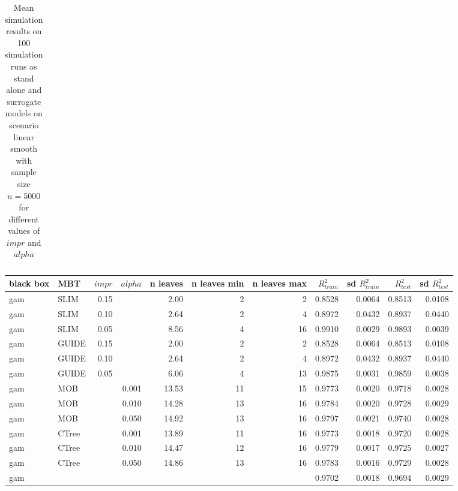 \begin{table}[!htb]
\begin{tabular}[t]{l|l|r|r|r|r|r|r|r|r|r}
\hline
\end{tabular}
\caption{Mean simulation results on 100 simulation runs as stand alone and surrogate models on scenario linear smooth with sample size $n = 5000$ for different values of $impr$ and $alpha$}
\label{tab:app_linear_smooth_5000}

\end{table}



\begin{table}[!htb]

\centering \tiny
\begin{tabular}[t]{l|l|r|r|r|r|r|r|r|r|r}
\hline
black box & MBT & $impr$ & $alpha$ & n leaves & n leaves min & n leaves max &  $R^2_{train}$ & sd $R^2_{train}$ & $R^2_{test}$ & sd $R^2_{test}$\\
\hline
gam & SLIM & 0.15 & & 2.00 & 2 & 2 & 0.8528 & 0.0064 & 0.8513 & 0.0108\\
gam & SLIM & 0.10 & & 2.64 & 2 & 4 & 0.8972 & 0.0432 & 0.8937 & 0.0440\\
gam & SLIM & 0.05 & & 8.56 & 4 & 16 & 0.9910 & 0.0029 & 0.9893 & 0.0039\\
gam & GUIDE & 0.15 & & 2.00 & 2 & 2 & 0.8528 & 0.0064 & 0.8513 & 0.0108\\
gam & GUIDE & 0.10 & & 2.64 & 2 & 4 & 0.8972 & 0.0432 & 0.8937 & 0.0440\\
gam & GUIDE & 0.05 & & 6.06 & 4 & 13 & 0.9875 & 0.0031 & 0.9859 & 0.0038\\
gam & MOB & & 0.001 & 13.53 & 11 & 15 & 0.9773 & 0.0020 & 0.9718 & 0.0028\\
gam & MOB & & 0.010 & 14.28 & 13 & 16 & 0.9784 & 0.0020 & 0.9728 & 0.0029\\
gam & MOB & & 0.050 & 14.92 & 13 & 16 & 0.9797 & 0.0021 & 0.9740 & 0.0028\\
gam & CTree & & 0.001 & 13.89 & 11 & 16 & 0.9773 & 0.0018 & 0.9720 & 0.0028\\
gam & CTree & & 0.010 & 14.47 & 12 & 16 & 0.9779 & 0.0017 & 0.9725 & 0.0027\\
gam & CTree & & 0.050 & 14.86 & 13 & 16 & 0.9783 & 0.0016 & 0.9729 & 0.0028\\
\hline
gam & & & & & & & 0.9702 & 0.0018 & 0.9694 & 0.0029\\
\hline


\end{tabular}
\end{table}
